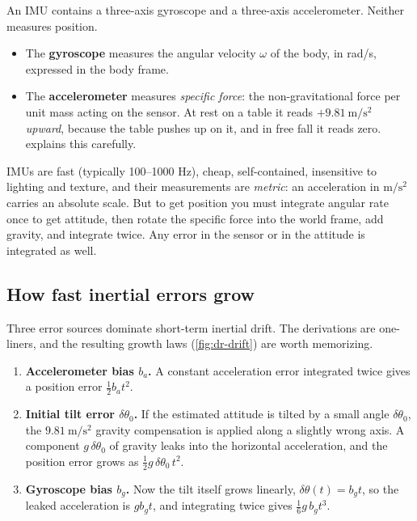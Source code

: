 An IMU contains a three-axis gyroscope and a three-axis accelerometer. Neither measures position.
\begin{itemize}
  \item The \textbf{gyroscope} measures the angular velocity $\omega$ of the body, in rad/s,
        expressed in the body frame.
  \item The \textbf{accelerometer} measures \emph{specific force}: the non-gravitational force per
        unit mass acting on the sensor. At rest on a table it reads $+9.81~\mathrm{m/s^2}$
        \emph{upward}, because the table pushes up on it, and in free fall it reads zero.
         explains this carefully.
\end{itemize}
IMUs are fast (typically 100--1000 Hz), cheap, self-contained, insensitive to lighting and
texture, and their measurements are \emph{metric}: an acceleration in $\mathrm{m/s^2}$ carries
an absolute scale. But to get position you must integrate angular rate once to get attitude, then
rotate the specific force into the world frame, add gravity, and integrate twice. Any error in the
sensor or in the attitude is integrated as well.

\subsection{How fast inertial errors grow}

Three error sources dominate short-term inertial drift. The derivations are one-liners, and the
resulting growth laws (\cref{fig:dr-drift}) are worth memorizing.

\begin{enumerate}
  \item \textbf{Accelerometer bias $b_a$.} A constant acceleration error integrated twice gives a
        position error $\tfrac12 b_a t^2$.
  \item \textbf{Initial tilt error $\delta\theta_0$.} If the estimated attitude is tilted by a small
        angle $\delta\theta_0$, the $9.81~\mathrm{m/s^2}$ gravity compensation is applied along a
        slightly wrong axis. A component $g\,\delta\theta_0$ of gravity leaks into the horizontal
        acceleration, and the position error grows as $\tfrac12 g\,\delta\theta_0\, t^2$.
  \item \textbf{Gyroscope bias $b_g$.} Now the tilt itself grows linearly, $\delta\theta(t) = b_g t$,
        so the leaked acceleration is $g b_g t$, and integrating twice gives
        $\tfrac16 g\, b_g t^3$.
\end{enumerate}

